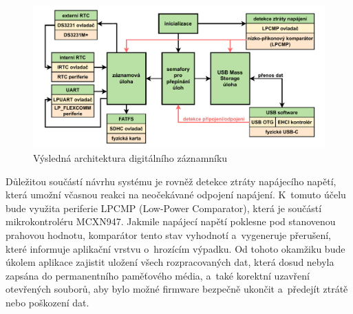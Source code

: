 \begin{figure}[h]
    \centering
    \includegraphics[width=1.00\textwidth]{obrazky-figures/system_architecture.pdf}
    
    \caption{Výsledná architektura digitálního záznamníku}
    \label{fig:system-architecture}
\end{figure}


Důležitou součástí návrhu systému je rovněž detekce ztráty napájecího napětí, která umožní včasnou reakci na neočekávané odpojení napájení. K~tomuto účelu bude využita periferie LPCMP (Low-Power Comparator), která je součástí mikrokontroléru MCXN947. Jakmile napájecí napětí poklesne pod stanovenou prahovou hodnotu, komparátor tento stav vyhodnotí a~vygeneruje přerušení, které informuje aplikační vrstvu o~hrozícím výpadku. Od tohoto okamžiku bude úkolem aplikace zajistit uložení všech rozpracovaných dat, která dosud nebyla zapsána do permanentního paměťového média, a~také korektní uzavření otevřených souborů, aby bylo možné firmware bezpečně ukončit a~předejít ztrátě nebo poškození dat.






